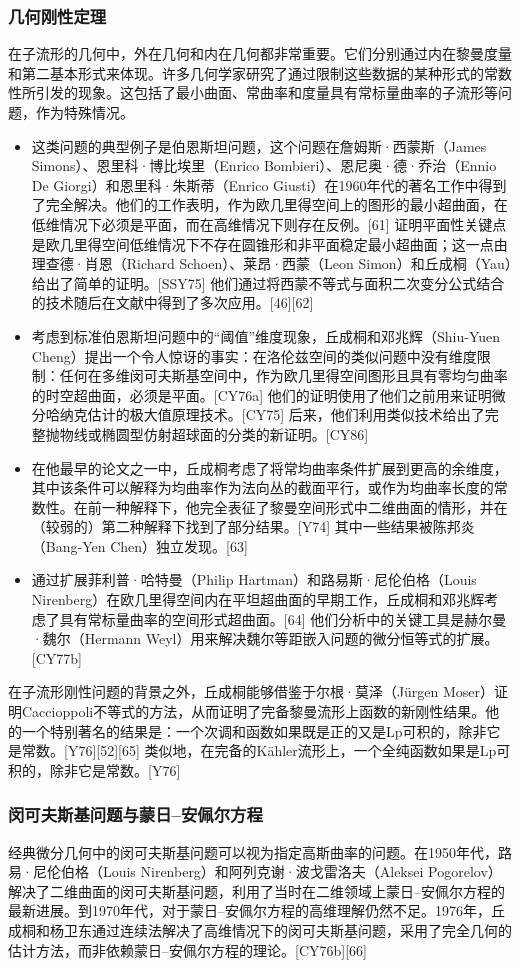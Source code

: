 \subsubsection{几何刚性定理}  
在子流形的几何中，外在几何和内在几何都非常重要。它们分别通过内在黎曼度量和第二基本形式来体现。许多几何学家研究了通过限制这些数据的某种形式的常数性所引发的现象。这包括了最小曲面、常曲率和度量具有常标量曲率的子流形等问题，作为特殊情况。
\begin{itemize}
\item 这类问题的典型例子是伯恩斯坦问题，这个问题在詹姆斯·西蒙斯（James Simons）、恩里科·博比埃里（Enrico Bombieri）、恩尼奥·德·乔治（Ennio De Giorgi）和恩里科·朱斯蒂（Enrico Giusti）在1960年代的著名工作中得到了完全解决。他们的工作表明，作为欧几里得空间上的图形的最小超曲面，在低维情况下必须是平面，而在高维情况下则存在反例。[61] 证明平面性关键点是欧几里得空间低维情况下不存在圆锥形和非平面稳定最小超曲面；这一点由理查德·肖恩（Richard Schoen）、莱昂·西蒙（Leon Simon）和丘成桐（Yau）给出了简单的证明。[SSY75] 他们通过将西蒙不等式与面积二次变分公式结合的技术随后在文献中得到了多次应用。[46][62]
\item 考虑到标准伯恩斯坦问题中的“阈值”维度现象，丘成桐和邓兆辉（Shiu-Yuen Cheng）提出一个令人惊讶的事实：在洛伦兹空间的类似问题中没有维度限制：任何在多维闵可夫斯基空间中，作为欧几里得空间图形且具有零均匀曲率的时空超曲面，必须是平面。[CY76a] 他们的证明使用了他们之前用来证明微分哈纳克估计的极大值原理技术。[CY75] 后来，他们利用类似技术给出了完整抛物线或椭圆型仿射超球面的分类的新证明。[CY86]
\item 在他最早的论文之一中，丘成桐考虑了将常均曲率条件扩展到更高的余维度，其中该条件可以解释为均曲率作为法向丛的截面平行，或作为均曲率长度的常数性。在前一种解释下，他完全表征了黎曼空间形式中二维曲面的情形，并在（较弱的）第二种解释下找到了部分结果。[Y74] 其中一些结果被陈邦炎（Bang-Yen Chen）独立发现。[63]
\item 通过扩展菲利普·哈特曼（Philip Hartman）和路易斯·尼伦伯格（Louis Nirenberg）在欧几里得空间内在平坦超曲面的早期工作，丘成桐和邓兆辉考虑了具有常标量曲率的空间形式超曲面。[64] 他们分析中的关键工具是赫尔曼·魏尔（Hermann Weyl）用来解决魏尔等距嵌入问题的微分恒等式的扩展。[CY77b]
\end{itemize}
在子流形刚性问题的背景之外，丘成桐能够借鉴于尔根·莫泽（Jürgen Moser）证明Caccioppoli不等式的方法，从而证明了完备黎曼流形上函数的新刚性结果。他的一个特别著名的结果是：一个次调和函数如果既是正的又是Lp可积的，除非它是常数。[Y76][52][65] 类似地，在完备的Kähler流形上，一个全纯函数如果是Lp可积的，除非它是常数。[Y76]
\subsubsection{闵可夫斯基问题与蒙日–安佩尔方程}  
经典微分几何中的闵可夫斯基问题可以视为指定高斯曲率的问题。在1950年代，路易·尼伦伯格（Louis Nirenberg）和阿列克谢·波戈雷洛夫（Aleksei Pogorelov）解决了二维曲面的闵可夫斯基问题，利用了当时在二维领域上蒙日–安佩尔方程的最新进展。到1970年代，对于蒙日–安佩尔方程的高维理解仍然不足。1976年，丘成桐和杨卫东通过连续法解决了高维情况下的闵可夫斯基问题，采用了完全几何的估计方法，而非依赖蒙日–安佩尔方程的理论。[CY76b][66]  

